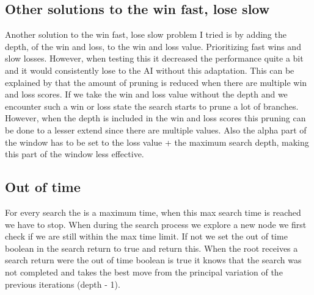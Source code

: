 \documentclass{article}
\begin{document}
\subsection{Other solutions to the win fast, lose slow}
Another solution to the win fast, lose slow problem I tried is by adding the depth, of the win and loss, to the win and loss value. Prioritizing fast wins and slow losses. However, when testing this it decreased the performance quite a bit and it would consistently lose to the AI without this adaptation. This can be explained by that the amount of pruning is reduced when there are multiple win and loss scores. If we take the win and loss value without the depth and we encounter such a win or loss state the search starts to prune a lot of branches. However, when the depth is included in the win and loss scores this pruning can be done to a lesser extend since there are multiple values. Also the alpha part of the window has to be set to the loss value + the maximum search depth, making this part of the window less effective.


\subsection{Out of time}
For every search the is a maximum time, when this max search time is reached we have to stop. When during the search process we explore a new node we first check if we are still within the max time limit. If not we set the out of time boolean in the search return to true and return this. When the root receives a search return were the out of time boolean is true it knows that the search was not completed and takes the best move from the principal variation of the previous iterations (depth - 1). 
\end{document}
